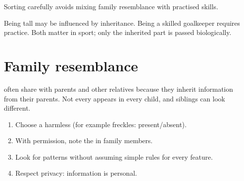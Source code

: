 \begin{omfigure}

{\small Sorting  carefully avoids mixing family resemblance with
practised skills.}
\end{omfigure}

\begin{example}[Football]\label{ex:g4:traits:sport}
Being tall may be influenced by inheritance. Being a skilled goalkeeper
requires practice. Both matter in sport; only the inherited part is
passed biologically.
\end{example}

\section{Family resemblance}

\begin{proposition}\label{prop:g4:traits:family}
 often share  with parents and other relatives because
they inherit information from their parents. Not every  appears in
every child, and siblings can look different.
\end{proposition}
\admitted

\begin{method}\label{met:g4:traits:chart}
\begin{enumerate}
  \item Choose a harmless  (for example freckles: present/absent).
  \item With permission, note the  in family members.
  \item Look for patterns without assuming simple rules for every
        feature.
  \item Respect privacy:  information is personal.
\end{enumerate}
\end{method}

